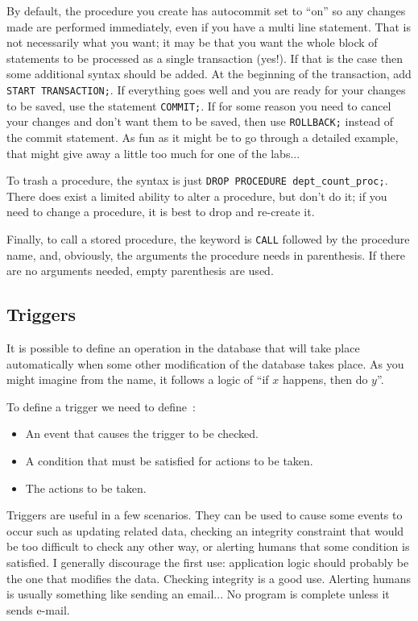 By default, the procedure you create has autocommit set to ``on'' so any changes made are performed immediately, even if you have a multi line statement. That is not necessarily what you want; it may be that you want the whole block of statements to be processed as a single transaction (yes!). If that is the case then some additional syntax should be added. At the beginning of the transaction, add \texttt{START TRANSACTION;}. If everything goes well and you are ready for your changes to be saved, use the statement \texttt{COMMIT;}. If for some reason you need to cancel your changes and don't want them to be saved, then use \texttt{ROLLBACK;} instead of the commit statement. As fun as it might be to go through a detailed example, that might give away a little too much for one of the labs...

To trash a procedure, the syntax is just \texttt{DROP PROCEDURE dept\_count\_proc;}. There does exist a limited ability to alter a procedure, but don't do it; if you need to change a procedure, it is best to drop and re-create it.

Finally, to call a stored procedure, the keyword is \texttt{CALL} followed by the procedure name, and, obviously, the arguments the procedure needs in parenthesis. If there are no arguments needed, empty parenthesis are used.

\subsection*{Triggers}

It is possible to define an operation in the database that will take place automatically when some other modification of the database takes place. As you might imagine from the name, it follows a logic of ``if $x$ happens, then do $y$''. 

To define a trigger we need to define~\cite{dsc}:
\begin{itemize}
	\item An event that causes the trigger to be checked.
	\item A condition that must be satisfied for actions to be taken.
	\item The actions to be taken.
\end{itemize}

Triggers are useful in a few scenarios. They can be used to cause some events to occur such as updating related data, checking an integrity constraint that would be too difficult to check any other way, or alerting humans that some condition is satisfied. I generally discourage the first use: application logic should probably be the one that modifies the data. Checking integrity is a good use. Alerting humans is usually something like sending an email... No program is complete unless it sends e-mail.

